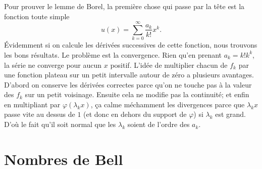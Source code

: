 \begin{remark}
    Pour prouver le lemme de Borel, la première chose qui passe par la tête est la fonction toute simple
    \begin{equation}
        u(x)=\sum_{k=0}^{\infty}\frac{ a_k }{ k! }x^k.
    \end{equation}
    Évidemment si on calcule les dérivées successives de cette fonction, nous trouvons les bons résultats. Le problème est la convergence.  Rien qu'en prenant \( a_k=k!k^k\), la série ne converge pour aucun \( x\) positif. L'idée de multiplier chacun de \( f_k\) par une fonction plateau sur un petit intervalle autour de zéro a plusieurs avantages. D'abord on conserve les dérivées correctes parce qu'on ne touche pas à la valeur des \( f_k\) sur un petit voisinage. Ensuite cela ne modifie pas la continuité; et enfin en multipliant par \( \varphi(\lambda_kx)\), ça calme méchamment les divergences parce que \( \lambda_kx\) passe vite au dessus de \( 1\) (et donc en dehors du support de \( \varphi\)) si \( \lambda_k\) est grand. D'où le fait qu'il soit normal que les \( \lambda_k\) soient de l'ordre des \( a_k\).
\end{remark}

\section{Nombres de Bell}

